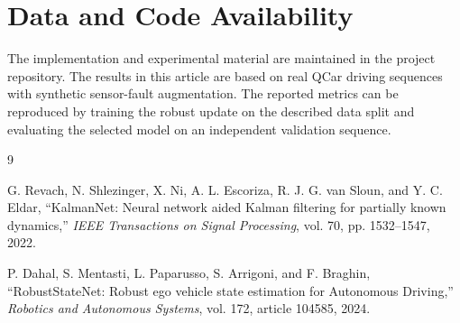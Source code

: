 \documentclass[11pt,a4paper]{article}
\begin{document}
\section*{Data and Code Availability}

The implementation and experimental material are maintained in the project
repository. The results in this article are based on real QCar driving
sequences with synthetic sensor-fault augmentation. The reported metrics can be
reproduced by training the robust update on the described data split and
evaluating the selected model on an independent validation sequence.

\begin{thebibliography}{9}

G. Revach, N. Shlezinger, X. Ni, A. L. Escoriza, R. J. G. van Sloun, and
Y. C. Eldar, ``KalmanNet: Neural network aided Kalman filtering for partially
known dynamics,'' \emph{IEEE Transactions on Signal Processing}, vol. 70,
pp. 1532--1547, 2022.

P. Dahal, S. Mentasti, L. Paparusso, S. Arrigoni, and F. Braghin,
``RobustStateNet: Robust ego vehicle state estimation for Autonomous Driving,''
\emph{Robotics and Autonomous Systems}, vol. 172, article 104585, 2024.

\end{thebibliography}
\end{document}
